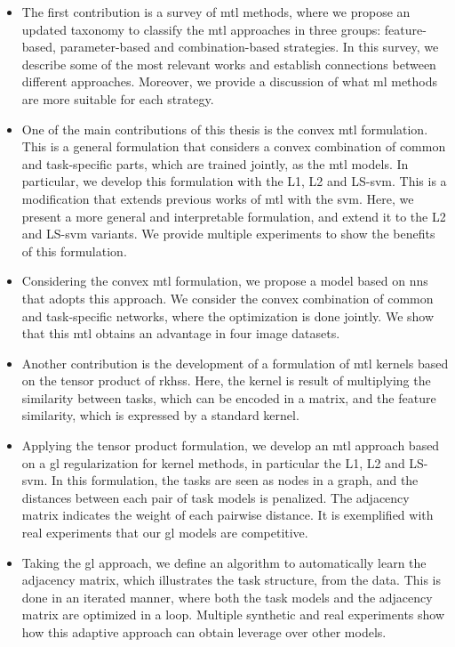 \begin{itemize}
    \item The first contribution is a survey of \acrfull{mtl} methods, where we propose an updated taxonomy to classify the \acrshort{mtl} approaches in three groups: feature-based, parameter-based and combination-based strategies. In this survey, we describe some of the most relevant works and establish connections between different approaches. Moreover, we provide a discussion of what \acrfull{ml} methods are more suitable for each strategy.
    \item One of the main contributions of this thesis is the convex \acrshort{mtl} formulation. This is a general formulation that considers a convex combination of common and task-specific parts, which are trained jointly, as the \acrshort{mtl} models. In particular, we develop this formulation with the L1, L2 and LS-\acrfull{svm}. This is a modification that extends previous works of \acrshort{mtl} with the \acrshort{svm}. Here, we present a more general and interpretable formulation, and extend it to the L2 and LS-\acrshort{svm} variants. We provide multiple experiments to show the benefits of this formulation.
    \item Considering the convex \acrshort{mtl} formulation, we propose a model based on \acrfull{nns} that adopts this approach. We consider the convex combination of common and task-specific networks, where the optimization is done jointly. We show that this \acrshort{mtl} obtains an advantage in four image datasets.
    \item Another contribution is the development of a formulation of \acrshort{mtl} kernels based on the tensor product of \acrfull{rkhss}. Here, the kernel is result of multiplying the similarity between tasks, which can be encoded in a matrix, and the feature similarity, which is expressed by a standard kernel.%
    \item Applying the tensor product formulation, we develop an \acrshort{mtl} approach based on a \acrfull{gl} regularization for kernel methods, in particular the L1, L2 and LS-\acrshort{svm}. In this formulation, the tasks are seen as nodes in a graph, and the distances between each pair of task models is penalized. The adjacency matrix indicates the weight of each pairwise distance. It is exemplified with real experiments that our \acrshort{gl} models are competitive.
    \item Taking the \acrshort{gl} approach, we define an algorithm to automatically learn the adjacency matrix, which illustrates the task structure, from the data. This is done in an iterated manner, where both the task models and the adjacency matrix are optimized in a loop. Multiple synthetic and real experiments show how this adaptive approach can obtain leverage over other models.
\end{itemize}


